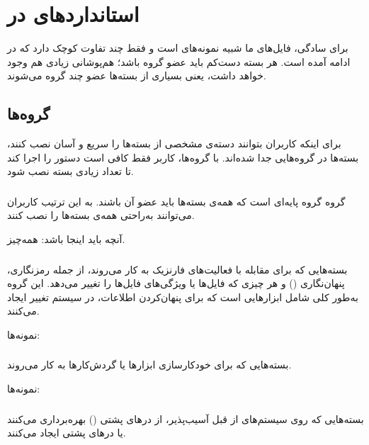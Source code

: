 \documentclass[a4paper, oneside, 11pt]{book}
\begin{document}
\section{استانداردهای  در }
برای سادگی، فایل‌های  ما شبیه نمونه‌های  است و فقط چند تفاوت کوچک
دارد که در ادامه آمده است. هر بسته دست‌کم باید عضو گروه  باشد؛
هم‌پوشانی زیادی هم وجود خواهد داشت، یعنی بسیاری از بسته‌ها عضو چند گروه
می‌شوند.

\subsection{گروه‌ها}
برای اینکه کاربران بتوانند دسته‌ی مشخصی از بسته‌ها را سریع و آسان نصب کنند،
بسته‌ها در گروه‌هایی جدا شده‌اند. با گروه‌ها، کاربر فقط کافی است دستور
 را اجرا کند تا تعداد زیادی بسته نصب شود.

\subsubsection{}
گروه  گروه پایه‌ای است که همه‌ی بسته‌ها باید عضو آن باشند. به این ترتیب
کاربران می‌توانند به‌راحتی همه‌ی بسته‌ها را نصب کنند.

آنچه باید اینجا باشد: همه‌چیز.

\subsubsection{}
بسته‌هایی که برای مقابله با فعالیت‌های فارنزیک به کار می‌روند، از جمله
رمزنگاری، پنهان‌نگاری () و هر چیزی که فایل‌ها یا ویژگی‌های
فایل‌ها را تغییر می‌دهد. این گروه به‌طور کلی شامل ابزارهایی است که برای
پنهان‌کردن اطلاعات، در سیستم تغییر ایجاد می‌کنند.

نمونه‌ها: 

\subsubsection{}
بسته‌هایی که برای خودکارسازی ابزارها یا گردش‌کارها به کار می‌روند.

نمونه‌ها: 

\subsubsection{}
بسته‌هایی که روی سیستم‌های از قبل آسیب‌پذیر، از درهای پشتی ()
بهره‌برداری می‌کنند یا درهای پشتی ایجاد می‌کنند.
\end{document}

